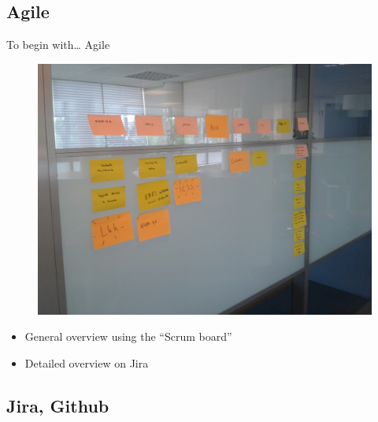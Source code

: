 \documentclass[10pt,a4paper]{beamer}
\begin{document}
\subsection{Agile}

\begin{frame}{To begin with… Agile}

	\begin{figure}[htp]
	\centering
	\includegraphics[scale=.15]{../img/agile1.jpg}
	 \label{fig.agile1}
	\end{figure}

  \begin{itemize}
    \item General overview using the ``Scrum board''
    \item Detailed overview on Jira
  \end{itemize}
  
\end{frame}

\subsection{Jira, Github}
\end{document}
